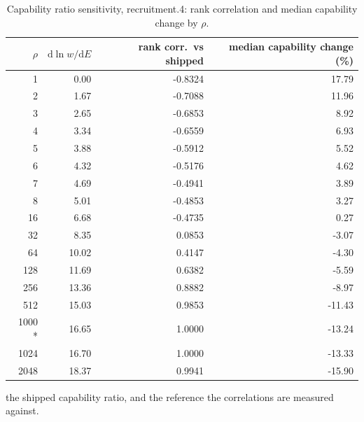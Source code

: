 \begin{table}[htbp]
  \centering
  \caption{Capability ratio sensitivity, recruitment.4: rank correlation and median capability change by $\rho$.}
  \label{tab:rho-recruitment-4-summary}
  \begin{tabular}{r r r r}
    \toprule
    $\rho$ & $\mathrm{d}\ln w/\mathrm{d}E$ & rank corr.\ vs shipped & median capability change (\%) \\
    \midrule
    1 & 0.00 & -0.8324 & 17.79 \\
    2 & 1.67 & -0.7088 & 11.96 \\
    3 & 2.65 & -0.6853 & 8.92 \\
    4 & 3.34 & -0.6559 & 6.93 \\
    5 & 3.88 & -0.5912 & 5.52 \\
    6 & 4.32 & -0.5176 & 4.62 \\
    7 & 4.69 & -0.4941 & 3.89 \\
    8 & 5.01 & -0.4853 & 3.27 \\
    16 & 6.68 & -0.4735 & 0.27 \\
    32 & 8.35 & 0.0853 & -3.07 \\
    64 & 10.02 & 0.4147 & -4.30 \\
    128 & 11.69 & 0.6382 & -5.59 \\
    256 & 13.36 & 0.8882 & -8.97 \\
    512 & 15.03 & 0.9853 & -11.43 \\
    1000 * & 16.65 & 1.0000 & -13.24 \\
    1024 & 16.70 & 1.0000 & -13.33 \\
    2048 & 18.37 & 0.9941 & -15.90 \\
    \bottomrule
  \end{tabular}
  \par\smallskip\footnotesize * the shipped capability ratio, and the reference the correlations are measured against.
\end{table}
